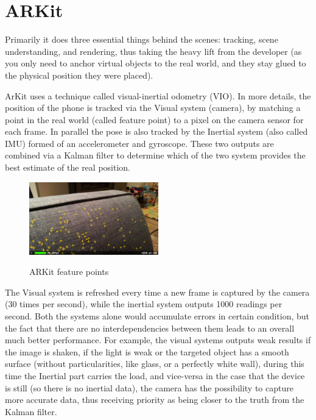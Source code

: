 \documentclass[12 pct]{report}
\begin{document}
\section{ARKit}
Primarily it does three essential things behind the scenes: tracking, scene understanding, and rendering, thus taking the heavy lift from the developer (as you only need to anchor virtual objects to the real world, and they stay glued to the physical position they were placed).

ArKit uses a technique called visual-inertial odometry (VIO). In more details, the position of the phone is tracked via the Visual system (camera), by matching a point in the real world (called feature point) to a pixel on the camera sensor for each frame. In parallel the pose is also tracked by the Inertial system  (also called IMU) formed of an accelerometer and gyroscope. These two outputs are combined via a Kalman filter to determine which of the two system provides the best estimate of the real position.

\begin{figure}[H]
\includegraphics[width=0.5\textwidth]{feature-points}
\centering
\label{fig:feature-points}
\caption{ARKit feature points}
\end{figure}


The Visual system is refreshed every time a new frame is captured by the camera (30 times per second), while the inertial system outputs 1000 readings per second. Both the systems alone would accumulate errors in certain condition, but the fact that there are no interdependencies between them leads to an overall much better performance. For example, the visual systems outputs weak results if the image is shaken, if the light is weak or the targeted object has a smooth surface (without particularities, like glass, or a perfectly white wall), during this time the Inertial part carries the load, and vice-versa in the case that the device is still (so there is no inertial data), the camera has the possibility to capture more accurate data, thus receiving priority as being closer to the truth from the Kalman filter.
\end{document}
